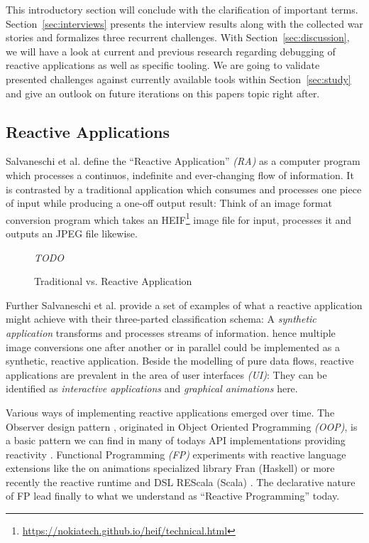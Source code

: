 \documentclass[12pt,a4paper]{article}
\begin{document}
This introductory section will conclude with the clarification of important terms. Section~\ref{sec:interviews} presents the interview results along with the collected war stories and formalizes three recurrent challenges. With Section~\ref{sec:discussion}, we will have a look at current and previous research regarding debugging of reactive applications as well as specific tooling. We are going to validate presented challenges against currently available tools within Section~\ref{sec:study} and give an outlook on future iterations on this papers topic right after.

\subsection{Reactive Applications}

Salvaneschi et al. \cite{comprehendingReactiveApplications} define the ``Reactive Application'' \emph{(RA)} as a computer program which processes a continuos, indefinite and ever-changing flow of information. It is contrasted by a traditional application which consumes and processes one piece of input while producing a one-off output result: Think of an image format conversion program which takes an HEIF\footnote{\url{https://nokiatech.github.io/heif/technical.html}} image file for input, processes it and outputs an JPEG file likewise.

\begin{figure}[h]
	\centering
	\emph{TODO}

	\caption{Traditional vs. Reactive Application}
	\label{fig:reactive-application}
\end{figure}

Further Salvaneschi et al. provide a set of examples of what a reactive application might achieve with their three-parted classification schema: A \emph{synthetic application} transforms and processes streams of information. hence multiple image conversions one after another or in parallel could be implemented as a synthetic, reactive application. Beside the modelling of pure data flows, reactive applications are prevalent in the area of user interfaces \emph{(UI)}: They can be identified as \emph{interactive applications} and \emph{graphical animations} here.

Various ways of implementing reactive applications emerged over time. The Observer design pattern \cite{observerDesignPattern}, originated in Object Oriented Programming \emph{(OOP)}, is a basic pattern we can find in many of todays API implementations providing reactivity \cite{ownPaper}. Functional Programming \emph{(FP)} experiments with reactive language extensions like the on animations specialized library Fran (Haskell) \cite{SurveyOnReactiveProgramming} or more recently the reactive runtime and DSL REScala (Scala) \cite{10.1145/2577080.2577083}. The declarative nature of FP lead finally to what we understand as ``Reactive Programming'' today.
\end{document}
